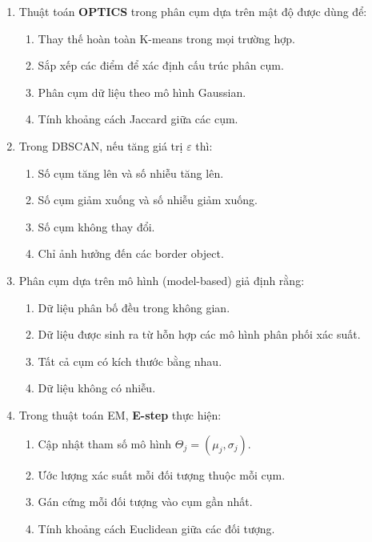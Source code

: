 \documentclass[10pt]{article}
\begin{document}
\begin{enumerate}[leftmargin=*, label=\textbf{Câu \arabic*.}]
    \item Thuật toán \textbf{OPTICS} trong phân cụm dựa trên mật độ được dùng để:
    \begin{enumerate}[label=\Alph*.]
        \item Thay thế hoàn toàn K-means trong mọi trường hợp.
        \item Sắp xếp các điểm để xác định cấu trúc phân cụm.
        \item Phân cụm dữ liệu theo mô hình Gaussian.
        \item Tính khoảng cách Jaccard giữa các cụm.
    \end{enumerate}

    \item Trong DBSCAN, nếu tăng giá trị $\varepsilon$ thì:
    \begin{enumerate}[label=\Alph*.]
        \item Số cụm tăng lên và số nhiễu tăng lên.
        \item Số cụm giảm xuống và số nhiễu giảm xuống.
        \item Số cụm không thay đổi.
        \item Chỉ ảnh hưởng đến các border object.
    \end{enumerate}

    \item Phân cụm dựa trên mô hình (model-based) giả định rằng:
    \begin{enumerate}[label=\Alph*.]
        \item Dữ liệu phân bố đều trong không gian.
        \item Dữ liệu được sinh ra từ hỗn hợp các mô hình phân phối xác suất.
        \item Tất cả cụm có kích thước bằng nhau.
        \item Dữ liệu không có nhiễu.
    \end{enumerate}

    \item Trong thuật toán EM, \textbf{E-step} thực hiện:
    \begin{enumerate}[label=\Alph*.]
        \item Cập nhật tham số mô hình $\Theta_j = (\mu_j, \sigma_j)$.
        \item Ước lượng xác suất mỗi đối tượng thuộc mỗi cụm.
        \item Gán cứng mỗi đối tượng vào cụm gần nhất.
        \item Tính khoảng cách Euclidean giữa các đối tượng.
    \end{enumerate}


\end{enumerate}
\end{document}
